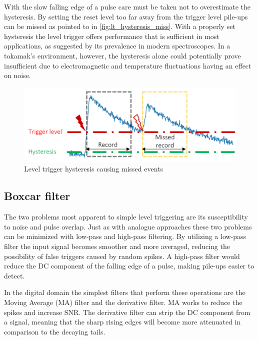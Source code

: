 With the slow falling edge of a pulse care must be taken not to 
overestimate the hysteresis. By setting the reset level too far away
from the trigger level pile-ups can be missed as pointed to in
\autoref{fig:lt_hysteresis_miss}. With a properly set hysteresis
the level trigger offers performance that is sufficient in most applications,
as suggested by its prevalence in modern spectroscopes.
In a tokamak's environment, however, the hysteresis
alone could potentially prove insufficient due to 
electromagnetic and temperature fluctuations having an effect on noise.
\begin{figure}[H]
  \centering
  \includegraphics[width=.7\linewidth]{media/lt_hysteresis_miss.png}
  \caption{Level trigger hysteresis causing missed events}
  \label{fig:lt_hysteresis_miss} 
\end{figure}
\subsection{Boxcar filter} \label{ssec:boxcar_filter}

The two problems most apparent to simple level triggering 
are its susceptibility to noise and pulse overlap.
Just as with analogue approaches these two problems 
can be minimized with low-pass and high-pass filtering.
By utilizing a low-pass filter the input signal becomes 
smoother and more averaged, reducing the possibility of 
false triggers caused by random spikes. A high-pass filter
would reduce the DC component of the falling edge of a pulse,
making pile-ups easier to detect.


In the digital domain the simplest filters that perform
these operations are the Moving Average (MA) filter and 
the derivative filter. MA works to reduce the spikes and increase 
SNR. The derivative filter can strip the DC component from
a signal, meaning that the sharp rising edges will become
more attenuated in comparison to the decaying tails.


